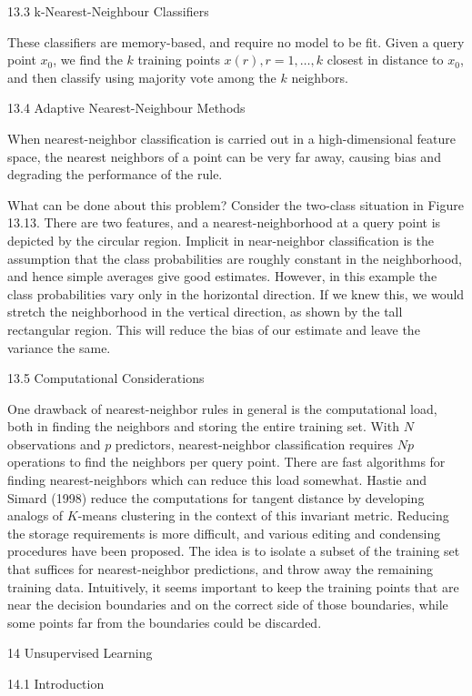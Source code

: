 13.3 k-Nearest-Neighbour Classifiers

These classifiers are memory-based, and require no model to be fit. Given a query point $x_0$, we find the $k$ training points $x(r),r=1,\dots ,k$ closest in distance to $x_0$, and then classify using majority vote among the $k$ neighbors.

13.4 Adaptive Nearest-Neighbour Methods

When nearest-neighbor classification is carried out in a high-dimensional feature space, the nearest neighbors of a point can be very far away, causing bias and degrading the performance of the rule.

What can be done about this problem? Consider the two-class situation in Figure 13.13. There are two features, and a nearest-neighborhood at a query point is depicted by the circular region. Implicit in near-neighbor classification is the assumption that the class probabilities are roughly constant in the neighborhood, and hence simple averages give good estimates. However, in this example the class probabilities vary only in the horizontal direction. If we knew this, we would stretch the neighborhood in the vertical direction, as shown by the tall rectangular region. This will reduce the bias of our estimate and leave the variance the same.

13.5 Computational Considerations

One drawback of nearest-neighbor rules in general is the computational load, both in finding the neighbors and storing the entire training set. With $N$ observations and $p$ predictors, nearest-neighbor classification requires $Np$ operations to find the neighbors per query point. There are fast algorithms for finding nearest-neighbors which can reduce this load somewhat. Hastie and Simard (1998) reduce the computations for tangent distance by developing analogs of $K$-means clustering in the context of this invariant metric. Reducing the storage requirements is more difficult, and various editing and condensing procedures have been proposed. The idea is to isolate a subset of the training set that suffices for nearest-neighbor predictions, and throw away the remaining training data. Intuitively, it seems important to keep the training points that are near the decision boundaries and on the correct side of those boundaries, while some points far from the boundaries could be discarded.

14 Unsupervised Learning

14.1 Introduction

